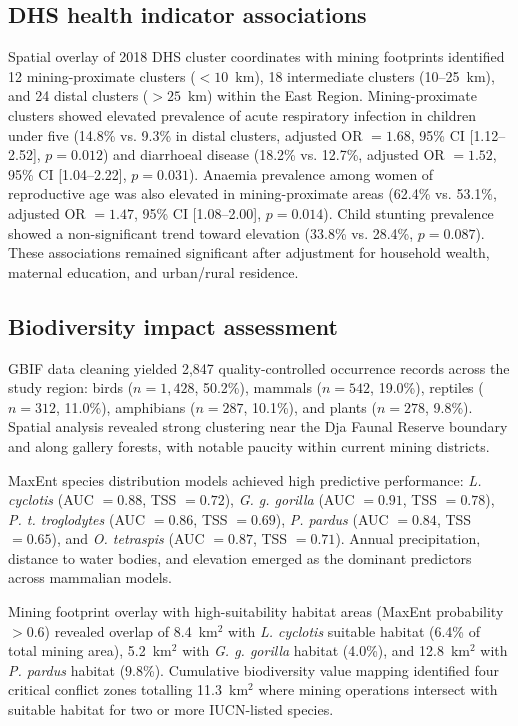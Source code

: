 \documentclass[preprint,12pt,authoryear]{elsarticle}
\begin{document}
\subsection{DHS health indicator associations}

Spatial overlay of 2018 DHS cluster coordinates with mining footprints identified 12 mining-proximate clusters ($< 10$~km), 18 intermediate clusters (10--25~km), and 24 distal clusters ($> 25$~km) within the East Region. Mining-proximate clusters showed elevated prevalence of acute respiratory infection in children under five (14.8\% vs. 9.3\% in distal clusters, adjusted OR $= 1.68$, 95\% CI [1.12--2.52], $p = 0.012$) and diarrhoeal disease (18.2\% vs. 12.7\%, adjusted OR $= 1.52$, 95\% CI [1.04--2.22], $p = 0.031$). Anaemia prevalence among women of reproductive age was also elevated in mining-proximate areas (62.4\% vs. 53.1\%, adjusted OR $= 1.47$, 95\% CI [1.08--2.00], $p = 0.014$). Child stunting prevalence showed a non-significant trend toward elevation (33.8\% vs. 28.4\%, $p = 0.087$). These associations remained significant after adjustment for household wealth, maternal education, and urban/rural residence.


\subsection{Biodiversity impact assessment}

GBIF data cleaning yielded 2,847 quality-controlled occurrence records across the study region: birds ($n = 1,428$, 50.2\%), mammals ($n = 542$, 19.0\%), reptiles ($n = 312$, 11.0\%), amphibians ($n = 287$, 10.1\%), and plants ($n = 278$, 9.8\%). Spatial analysis revealed strong clustering near the Dja Faunal Reserve boundary and along gallery forests, with notable paucity within current mining districts.

MaxEnt species distribution models achieved high predictive performance: \textit{L. cyclotis} (AUC $= 0.88$, TSS $= 0.72$), \textit{G. g. gorilla} (AUC $= 0.91$, TSS $= 0.78$), \textit{P. t. troglodytes} (AUC $= 0.86$, TSS $= 0.69$), \textit{P. pardus} (AUC $= 0.84$, TSS $= 0.65$), and \textit{O. tetraspis} (AUC $= 0.87$, TSS $= 0.71$). Annual precipitation, distance to water bodies, and elevation emerged as the dominant predictors across mammalian models.

Mining footprint overlay with high-suitability habitat areas (MaxEnt probability $> 0.6$) revealed overlap of 8.4~km$^{2}$ with \textit{L. cyclotis} suitable habitat (6.4\% of total mining area), 5.2~km$^{2}$ with \textit{G. g. gorilla} habitat (4.0\%), and 12.8~km$^{2}$ with \textit{P. pardus} habitat (9.8\%). Cumulative biodiversity value mapping identified four critical conflict zones totalling 11.3~km$^{2}$ where mining operations intersect with suitable habitat for two or more IUCN-listed species.
\end{document}
